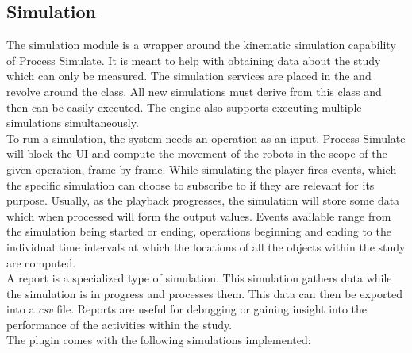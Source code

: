 \subsection{Simulation}

The simulation module is a wrapper around the kinematic simulation capability of Process Simulate. It is meant to help with obtaining data about the study which can only be measured. The simulation services are placed in the  and revolve around the  class. All new simulations must derive from this class and then can be easily executed. The engine also supports executing multiple simulations simultaneously. \\

To run a simulation, the system needs an operation as an input. Process Simulate will block the UI and compute the movement of the robots in the scope of the given operation, frame by frame. While simulating the player fires events, which the specific simulation can choose to subscribe to if they are relevant for its purpose. Usually, as the playback progresses, the simulation will store some data which when processed will form the output values. Events available range from the simulation being started or ending, operations beginning and ending to the individual time intervals at which the locations of all the objects within the study are computed. \\

A report is a specialized type of simulation. This simulation gathers data while the simulation is in progress and processes them. This data can then be exported into a \emph{csv} file. Reports are useful for debugging or gaining insight into the performance of the activities within the study. \\

The plugin comes with the following simulations implemented:

